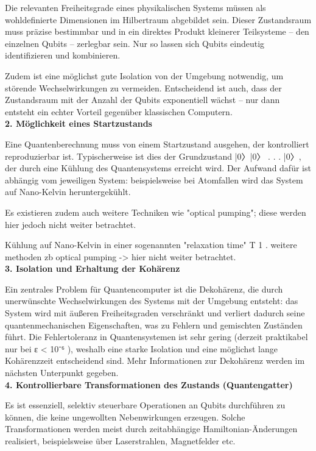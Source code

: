 Die relevanten Freiheitsgrade eines physikalischen Systems müssen als wohldefinierte Dimensionen im Hilbertraum abgebildet sein. Dieser Zustandsraum muss präzise bestimmbar und in ein direktes Produkt kleinerer Teilsysteme – den einzelnen Qubits – zerlegbar sein. Nur so lassen sich Qubits eindeutig identifizieren und kombinieren.

Zudem ist eine möglichst gute Isolation von der Umgebung notwendig, um störende Wechselwirkungen zu vermeiden. Entscheidend ist auch, dass der Zustandsraum mit der Anzahl der Qubits exponentiell wächst – nur dann entsteht ein echter Vorteil gegenüber klassischen Computern.
 \\

\textbf{{2. Möglichkeit eines Startzustands} }

Eine Quantenberechnung muss von einem Startzustand ausgehen, der kontrolliert reproduzierbar ist. Typischerweise ist dies der Grundzustand |0〉|0〉 . . . |0〉, der durch eine Kühlung des Quantensystems erreicht wird.  Der Aufwand dafür ist abhängig vom jeweiligen System: beispielsweise bei Atomfallen wird das System auf Nano-Kelvin heruntergekühlt. 

Es existieren zudem auch weitere Techniken wie "optical pumping"; diese werden hier jedoch nicht weiter betrachtet. 

\cite{lapierre_introduction_2021} 

Kühlung auf Nano-Kelvin 
in einer sogenannten "relaxation time" T 1 . weitere methoden zb optical pumping -> hier nicht weiter betrachtet. \\


\textbf{3. Isolation und Erhaltung der Kohärenz} 

Ein zentrales Problem für Quantencomputer ist die Dekohärenz, die durch unerwünschte Wechselwirkungen des Systems mit der Umgebung entsteht: das System wird mit äußeren Freiheitsgraden verschränkt und verliert dadurch seine quantenmechanischen Eigenschaften, was zu Fehlern und gemischten Zuständen führt. Die Fehlertoleranz in Quantensystemen ist sehr gering (derzeit praktikabel nur bei ε < 10⁻⁶ ), weshalb eine starke Isolation und eine möglichst lange Kohärenzzeit entscheidend sind. Mehr Informationen zur Dekohärenz werden im nächsten Unterpunkt gegeben. \\
 
\textbf{4. Kontrollierbare Transformationen des Zustands (Quantengatter)}

Es ist essenziell, selektiv steuerbare Operationen an Qubits durchführen zu können, die keine ungewollten Nebenwirkungen erzeugen. Solche Transformationen werden meist durch zeitabhängige Hamiltonian-Änderungen realisiert, beispielsweise über Laserstrahlen, Magnetfelder etc. \\



